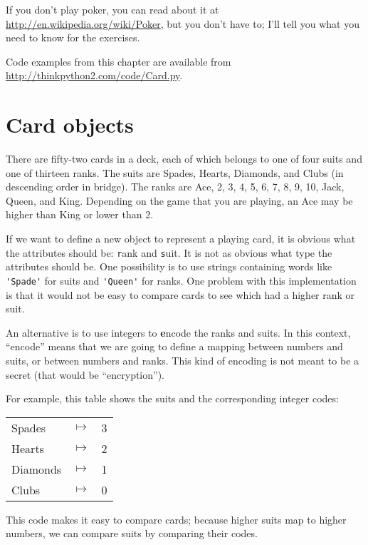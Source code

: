 \documentclass[
DIV=11,
fontsize=13,
twoside,
headinclude=false,
titlepage=firstiscover,
abstract=true,
headsepline=true,
footsepline=true,
chapterprefix=true, %
headings=big,
bibliography=totoc,%
captions=tableheading
]{scrbook}
\theoremstyle{definition}
\begin{document}
If you don't play
poker, you can read about it at
\url{http://en.wikipedia.org/wiki/Poker}, but you don't have to; I'll
tell you what you need to know for the exercises.

Code examples from
this chapter are available from
\url{http://thinkpython2.com/code/Card.py}.


\section{Card objects}

There are fifty-two cards in a deck, each of which belongs to one of
four suits and one of thirteen ranks.  The suits are Spades, Hearts,
Diamonds, and Clubs (in descending order in bridge).  The ranks are
Ace, 2, 3, 4, 5, 6, 7, 8, 9, 10, Jack, Queen, and King.  Depending on
the game that you are playing, an Ace may be higher than King
or lower than 2.

If we want to define a new object to represent a playing card, it is
obvious what the attributes should be: {\texttt rank} and
{\texttt suit}.  It is not as obvious what type the attributes
should be.  One possibility is to use strings containing words like
\verb"'Spade'" for suits and \verb"'Queen'" for ranks.  One problem with
this implementation is that it would not be easy to compare cards to
see which had a higher rank or suit.

An alternative is to use integers to {\textbf encode} the ranks and suits.
In this context, ``encode'' means that we are going to define a mapping
between numbers and suits, or between numbers and ranks.  This
kind of encoding is not meant to be a secret (that
would be ``encryption'').

\newcommand{\mymapsto}{$\mapsto$}

For example, this table shows the suits and the corresponding integer
codes:

\begin{tabular}{l c l}
Spades & \mymapsto & 3 \\
Hearts & \mymapsto & 2 \\
Diamonds & \mymapsto & 1 \\
Clubs & \mymapsto & 0
\end{tabular}

This code makes it easy to compare cards; because higher suits map to
higher numbers, we can compare suits by comparing their codes.
\end{document}
